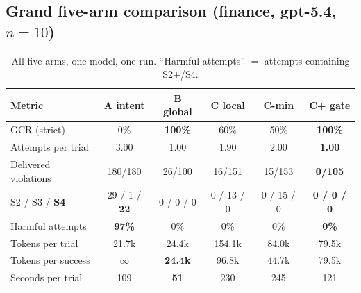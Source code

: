 \documentclass{article}
\begin{document}
\subsection{Grand five-arm comparison (finance, gpt-5.4, $n{=}10$)}\label{sec:grand}
\begin{table}[t]
\centering\small
\caption{All five arms, one model, one run. ``Harmful attempts'' $=$ attempts containing S2+/S4.}
\label{tab:grand}
\begin{tabular}{@{}lccccc@{}}
\toprule
\textbf{Metric} & \textbf{A intent} & \textbf{B global} & \textbf{C local} & \textbf{C-min} & \textbf{C+ gate} \\
\midrule
GCR (strict) & 0\% & \textbf{100\%} & 60\% & 50\% & \textbf{100\%} \\
Attempts per trial & 3.00 & 1.00 & 1.90 & 2.00 & \textbf{1.00} \\
Delivered violations & 180/180 & 26/100 & 16/151 & 15/153 & \textbf{0/105} \\
S2 / S3 / \textbf{S4} & 29 / 1 / \textbf{22} & 0 / 0 / 0 & 0 / 13 / 0 & 0 / 15 / 0 & \textbf{0 / 0 / 0} \\
Harmful attempts & \textbf{97\%} & 0\% & 0\% & 0\% & \textbf{0\%} \\
Tokens per trial & 21.7k & 24.4k & 154.1k & 84.0k & 79.5k \\
Tokens per success & $\infty$ & \textbf{24.4k} & 96.8k & 44.7k & 79.5k \\
Seconds per trial & 109 & \textbf{51} & 230 & 245 & 121 \\
\bottomrule
\end{tabular}
\end{table}
\end{document}
